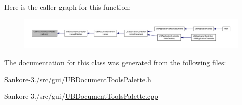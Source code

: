 Here is the caller graph for this function\-:
\nopagebreak
\begin{figure}[H]
\begin{center}
\leavevmode
\includegraphics[width=350pt]{d9/dee/class_u_b_document_tools_palette_a1e3c9893bdad8b3eb8c816327fc5adb7_icgraph}
\end{center}
\end{figure}




The documentation for this class was generated from the following files\-:\begin{DoxyCompactItemize}
\item 
Sankore-\/3./src/gui/\hyperlink{_u_b_document_tools_palette_8h}{U\-B\-Document\-Tools\-Palette.\-h}\item 
Sankore-\/3./src/gui/\hyperlink{_u_b_document_tools_palette_8cpp}{U\-B\-Document\-Tools\-Palette.\-cpp}\end{DoxyCompactItemize}
